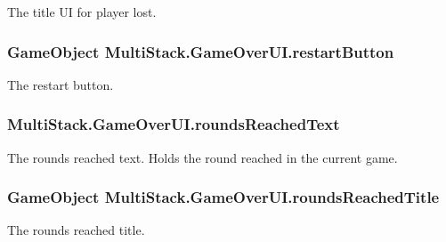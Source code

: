 The title U\+I for player lost. 

\hypertarget{class_multi_stack_1_1_game_over_u_i_a7c0173e7b31a3367c9b75cc1a384c56e}{}
\subsubsection[{restart\+Button}]{\setlength{\rightskip}{0pt plus 5cm}Game\+Object Multi\+Stack.\+Game\+Over\+U\+I.\+restart\+Button}\label{class_multi_stack_1_1_game_over_u_i_a7c0173e7b31a3367c9b75cc1a384c56e}


The restart button. 

\hypertarget{class_multi_stack_1_1_game_over_u_i_a0033ad5b25bfd1e023887833069669b9}{}
\subsubsection[{rounds\+Reached\+Text}]{ Multi\+Stack.\+Game\+Over\+U\+I.\+rounds\+Reached\+Text}\label{class_multi_stack_1_1_game_over_u_i_a0033ad5b25bfd1e023887833069669b9}


The rounds reached text. Holds the round reached in the current game. 

\hypertarget{class_multi_stack_1_1_game_over_u_i_a4c5b2ff1188a2911cc30e340ef72c66e}{}
\subsubsection[{rounds\+Reached\+Title}]{\setlength{\rightskip}{0pt plus 5cm}Game\+Object Multi\+Stack.\+Game\+Over\+U\+I.\+rounds\+Reached\+Title}\label{class_multi_stack_1_1_game_over_u_i_a4c5b2ff1188a2911cc30e340ef72c66e}


The rounds reached title. 

\hypertarget{class_multi_stack_1_1_game_over_u_i_a05e9dc451638ae9d0a414eb45145f9cc}{}
